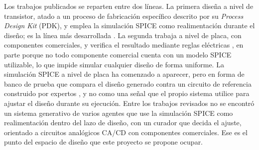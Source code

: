 Los trabajos publicados se reparten entre dos líneas. La primera diseña a nivel de transistor, atado a un proceso de fabricación específico descrito por su \textit{Process Design Kit} (PDK), y emplea la simulación SPICE como realimentación durante el diseño; es la línea más desarrollada \cite{analogcoder, analogagent, analogsage}. La segunda trabaja a nivel de placa, con componentes comerciales, y verifica el resultado mediante reglas eléctricas \cite{circuitlm, pcbschemagen}, en parte porque no todo componente comercial cuenta con un modelo SPICE utilizable, lo que impide simular cualquier diseño de forma uniforme. La simulación SPICE a nivel de placa ha comenzado a aparecer, pero en forma de banco de prueba que compara el diseño generado contra un circuito de referencia construido por expertos \cite{hwebench}, y no como una señal que el propio sistema utilice para ajustar el diseño durante su ejecución. Entre los trabajos revisados no se encontró un sistema generativo de varios agentes que use la simulación SPICE como realimentación dentro del lazo de diseño, con un curador que decida el ajuste, orientado a circuitos analógicos CA/CD con componentes comerciales. Ese es el punto del espacio de diseño que este proyecto se propone ocupar.
